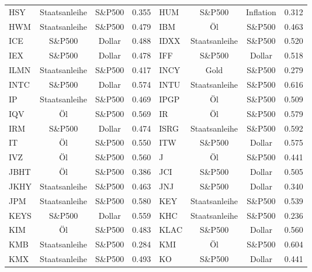 \begin{longtable}{l c c c | l c c c}
    HSY    & Staatsanleihe & S\&P500   & 0.355         & HUM    & S\&P500       & Inflation & 0.312         \\
    HWM    & Staatsanleihe & S\&P500   & 0.479         & IBM    & Öl            & S\&P500   & 0.463         \\
    ICE    & S\&P500       & Dollar    & 0.488         & IDXX   & Staatsanleihe & S\&P500   & 0.520         \\
    IEX    & S\&P500       & Dollar    & 0.478         & IFF    & S\&P500       & Dollar    & 0.518         \\
    ILMN   & Staatsanleihe & S\&P500   & 0.417         & INCY   & Gold          & S\&P500   & 0.279         \\
    INTC   & S\&P500       & Dollar    & 0.574         & INTU   & Staatsanleihe & S\&P500   & 0.616         \\
    IP     & Staatsanleihe & S\&P500   & 0.469         & IPGP   & Öl            & S\&P500   & 0.509         \\
    IQV    & Öl            & S\&P500   & 0.569         & IR     & Öl            & S\&P500   & 0.579         \\
    IRM    & S\&P500       & Dollar    & 0.474         & ISRG   & Staatsanleihe & S\&P500   & 0.592         \\
    IT     & Öl            & S\&P500   & 0.550         & ITW    & S\&P500       & Dollar    & 0.575         \\
    IVZ    & Öl            & S\&P500   & 0.560         & J      & Öl            & S\&P500   & 0.441         \\
    JBHT   & Öl            & S\&P500   & 0.386         & JCI    & S\&P500       & Dollar    & 0.505         \\
    JKHY   & Staatsanleihe & S\&P500   & 0.463         & JNJ    & S\&P500       & Dollar    & 0.340         \\
    JPM    & Staatsanleihe & S\&P500   & 0.580         & KEY    & Staatsanleihe & S\&P500   & 0.539         \\
    KEYS   & S\&P500       & Dollar    & 0.559         & KHC    & Staatsanleihe & S\&P500   & 0.236         \\
    KIM    & Öl            & S\&P500   & 0.483         & KLAC   & S\&P500       & Dollar    & 0.560         \\
    KMB    & Staatsanleihe & S\&P500   & 0.284         & KMI    & Öl            & S\&P500   & 0.604         \\
    KMX    & Staatsanleihe & S\&P500   & 0.493         & KO     & S\&P500       & Dollar    & 0.441         \\

\end{longtable}
